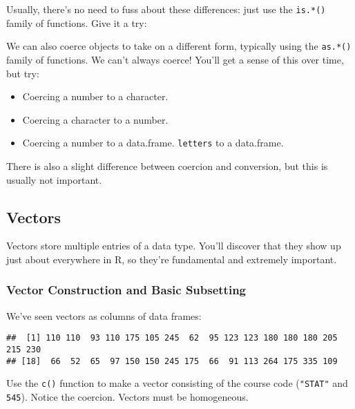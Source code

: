\documentclass[]{article}
\newenvironment{Shaded}{\begin{snugshade}}{\end{snugshade}}
\newcommand{\OperatorTok}[1]{\textcolor[rgb]{0.81,0.36,0.00}{\textbf{#1}}}
\newcommand{\NormalTok}[1]{#1}
\providecommand{\tightlist}{%
  \setlength{\itemsep}{0pt}\setlength{\parskip}{0pt}}
\begin{document}
Usually, there's no need to fuss about these differences: just use the
\texttt{is.*()} family of functions. Give it a try:

We can also coerce objects to take on a different form, typically using
the \texttt{as.*()} family of functions. We can't always coerce! You'll
get a sense of this over time, but try:

\begin{itemize}
\tightlist
\item
  Coercing a number to a character.
\item
  Coercing a character to a number.
\item
  Coercing a number to a data.frame. \texttt{letters} to a data.frame.
\end{itemize}

There is also a slight difference between coercion and conversion, but
this is usually not important.

\subsection{Vectors}\label{vectors}

Vectors store multiple entries of a data type. You'll discover that they
show up just about everywhere in R, so they're fundamental and extremely
important.

\subsubsection{Vector Construction and Basic
Subsetting}\label{vector-construction-and-basic-subsetting}

We've seen vectors as columns of data frames:

\begin{Shaded}
\end{Shaded}

\begin{verbatim}
##  [1] 110 110  93 110 175 105 245  62  95 123 123 180 180 180 205 215 230
## [18]  66  52  65  97 150 150 245 175  66  91 113 264 175 335 109
\end{verbatim}

Use the \texttt{c()} function to make a vector consisting of the course
code (\texttt{"STAT"} and \texttt{545}). Notice the coercion. Vectors
must be homogeneous.
\end{document}
